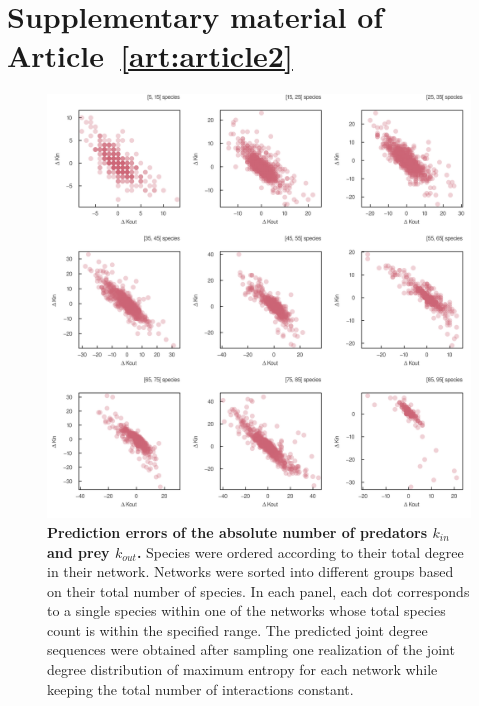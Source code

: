 
\francais   

\setcounter{figure}{0}
\renewcommand{\thefigure}{B\arabic{figure}}

\setcounter{table}{0}
\renewcommand{\thetable}{\arabic{chapter}.\arabic{table}}

\chapter{Supplementary material of Article~\ref{art:article2}}\label{supp:B}

\begin{figure}[h]
    \centering
    \includegraphics[width=\textwidth]{figures/S_article2/kin_kout_difference_strata.png}
    \caption{\textbf{Prediction errors of the absolute number of predators $k_{in}$ and prey
    $k_{out}$.} Species were ordered according to their total degree in their
    network. Networks were sorted into different groups based on their total number
    of species. In each panel, each dot corresponds to a single species within one
    of the networks whose total species count is within the specified range. The
    predicted joint degree sequences were obtained after sampling one realization of
    the joint degree distribution of maximum entropy for each network while keeping
    the total number of interactions
    constant.}
    \label{fig:kin_kout_diff_strata}
\end{figure}

